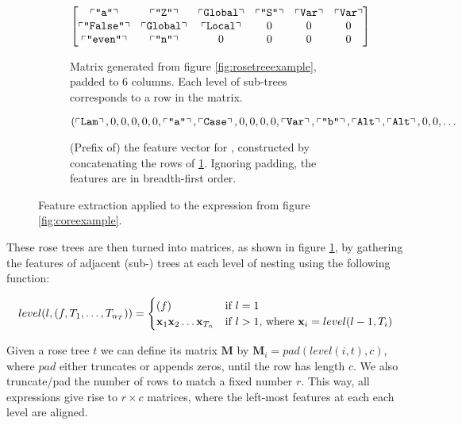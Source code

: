 \begin{figure}
\begin{subfigure}{\textwidth}
\begin{equation*}
\begin{bmatrix}
        \left\ulcorner \texttt{"a"} \right\urcorner     & \left\ulcorner \texttt{"Z"} \right\urcorner    & \left\ulcorner \texttt{Global} \right\urcorner & \left\ulcorner \texttt{"S"} \right\urcorner    & \left\ulcorner \texttt{Var} \right\urcorner & \left\ulcorner \texttt{Var} \right\urcorner  \\
        \left\ulcorner \texttt{"False"} \right\urcorner & \left\ulcorner \texttt{Global} \right\urcorner  & \left\ulcorner \texttt{Local} \right\urcorner  & 0                   & 0               & 0                \\
        \left\ulcorner \texttt{"even"} \right\urcorner  & \left\ulcorner \texttt{"n"} \right\urcorner    & 0                  & 0                   & 0               & 0
      \end{bmatrix}
    \end{equation*}
    \caption{Matrix generated from figure \ref{fig:rosetreeexample}, padded to 6 columns. Each level of sub-trees corresponds to a row in the matrix.}
    \label{fig:matrixexample}
  \end{subfigure}
  \vspace{1ex}
  \begin{subfigure}{\textwidth}
    \begin{equation*}
      (\left\ulcorner \texttt{Lam} \right\urcorner, 0, 0, 0, 0, 0, \left\ulcorner \texttt{"a"} \right\urcorner, \left\ulcorner \texttt{Case} \right\urcorner, 0, 0, 0, 0, \left\ulcorner \texttt{Var} \right\urcorner, \left\ulcorner \texttt{"b"} \right\urcorner, \left\ulcorner \texttt{Alt} \right\urcorner, \left\ulcorner \texttt{Alt} \right\urcorner, 0, 0, \dots
     \end{equation*}
     \caption{(Prefix of) the feature vector for , constructed by concatenating the rows of \ref{fig:matrixexample}. Ignoring padding, the features are in breadth-first order.}
     \label{fig:vectorexample}
  \end{subfigure}
  \caption{Feature extraction applied to the expression  from figure \ref{fig:coreexample}.}
\end{figure}

These rose trees are then turned into matrices, as shown in figure \ref{fig:matrixexample}, by gathering the features of adjacent (sub-) trees at each level of nesting using the following function:

\begin{equation*}
  level(l, (f, T_1, \dots, T_{n_T})) =
    \begin{cases}
      (f) & \text{if $l = 1$} \\
      \mathbf{x}_1 \mathbf{x}_2 \dots \mathbf{x}_{T_n} & \text{if $l > 1$, where $\mathbf{x}_i = level(l - 1, T_i)$}
    \end{cases}
\end{equation*}

Given a rose tree $t$ we can define its matrix $\mathbf{M}$ by $\mathbf{M}_i = pad(level(i, t), c)$, where $pad$ either truncates or appends zeros, until the row has length $c$. We also truncate/pad the number of rows to match a fixed number $r$. This way, all expressions give rise to $r \times c$ matrices, where the left-most features at each each level are aligned.

